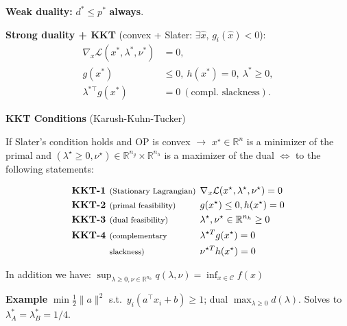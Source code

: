 \textbf{Weak duality:} \(d^*\le p^*\) \textbf{always}.

\textbf{Strong duality + KKT} (convex + Slater: \(\exists\hat x\),
\(g_i(\hat x)<0\)):
\begin{align*}
  \nabla_x\mathcal L(x^*,\lambda^*,\nu^*)&=0,\\
  g(x^*)&\le0,\ h(x^*)=0,\ \lambda^*\ge0,\\
  \lambda^{*\top}g(x^*)&=0\ (\text{compl.\ slackness}).
\end{align*}

\begin{sstTitleBox}[BrickRed]{\textbf{\large
    KKT  Conditions}
  \normalsize(Karush-Kuhn-Tucker)}
  \begin{sstOnlyFrame}[BrickRed]

    If Slater's condition holds and
    OP is convex
    $\rightarrow$
    $x^\star \in \mathbb{R}^{n}$ is a minimizer of the primal
    and
    $(\lambda^\star\ge0,\nu^\star)\in\mathbb{R}^{n_g}\times\mathbb{R}^{n_h}$
    is a maximizer of the dual $\Leftrightarrow$
    to the following statements:
  \end{sstOnlyFrame}
  \begin{sstFullFrame}[BrickRed]
    \vspace{-3mm}
    \color{white}
    \small
    \[
      \begin{aligned}
        \textbf{KKT-1 } & \text{\footnotesize (Stationary
        Lagrangian)} \hspace{-2mm} &  &
        \nabla_x\mathcal{L}(x^\star,\lambda^\star,\nu^\star)  =  0
        \\
        \textbf{KKT-2 } & \text{\footnotesize (primal
        feasibility)}                  &  & g(x^\star)\le0,
        h(x^\star)                            =                            0
        \\
        \textbf{KKT-3 } & \text{\footnotesize (dual feasibility)}
        &  & \lambda^\star  , \nu^\star \in \mathbb{R}^{n_h}
        \ge       0
        \\
        \textbf{KKT-4 } & \text{\footnotesize (complementary}
          &  & \lambda^{\star T} g(x^\star)
          =                          0
          \\
        & \text{\footnotesize slackness)}
        &  & \nu^{\star T} h(x^\star)                              =  0
    \end{aligned}\]
    \vspace{-4mm}
  \end{sstFullFrame}
  \begin{sstOnlyFrame}[BrickRed]
    In addition we have:
    $\sup_{\lambda\ge0,\nu\in\mathbb{R}^{n_h}}q(\lambda,\nu)=\inf_{x\in\mathcal{C}}f(x)$
  \end{sstOnlyFrame}
\end{sstTitleBox}
\textbf{Example} \(\min\frac12\|a\|^2\) s.t.\ \(y_i(a^\top
x_i+b)\ge1\); dual \(\max_{\lambda\ge0}d(\lambda)\). Solves to
\(\lambda_A^*=\lambda_B^*=1/4\).

